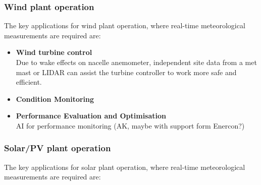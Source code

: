 \subsubsection{Wind plant operation}
The key applications for wind plant operation, where real-time meteorological measurements are required are: 

\begin{itemize}
    \item \textbf{Wind turbine control}\\
    Due to wake effects on nacelle anemometer, independent site data from a met mast or LIDAR can assist the turbine controller to work more safe and efficient. 
    \item \textbf{Condition Monitoring}\\
    
    \item \textbf{Performance Evaluation and Optimisation}\\
    AI for performance monitoring (AK, maybe with support form Enercon?) 
    
\end{itemize}

\cite{Jing2020}

\subsubsection{Solar/PV plant operation}

The key applications for solar plant operation, where real-time meteorological measurements are required are: 


